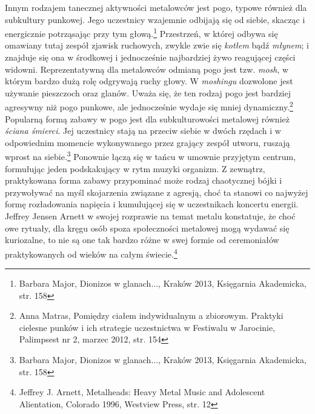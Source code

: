\documentclass[12pt, a4paper, titlepage]{report}
\begin{document}
Innym rodzajem tanecznej aktywności metalowców jest pogo, typowe również dla subkultury punkowej. Jego uczestnicy wzajemnie odbijają się od siebie, skacząc i energicznie potrząsając przy tym głową.\footnote{Barbara Major, Dionizos w glanach..., Kraków 2013, Księgarnia Akademicka, str. 158} Przestrzeń, w której odbywa się omawiany tutaj zespół zjawisk ruchowych, zwykle zwie się \textit{kotłem} bądź \textit{młynem}; i znajduje się ona w środkowej i jednocześnie najbardziej żywo reagującej części widowni. Reprezentatywną dla metalowców odmianą pogo jest tzw. \textit{mosh}, w którym bardzo dużą rolę odgrywają ruchy głowy. W \textit{moshingu} dozwolone jest używanie pieszczoch oraz glanów. Uważa się, że ten rodzaj pogo jest bardziej agresywny niż pogo punkowe, ale jednocześnie wydaje się mniej dynamiczny.\footnote{Anna Matras, Pomiędzy ciałem indywidualnym a zbiorowym. Praktyki cielesne punków i ich strategie uczestnictwa w Festiwalu w Jarocinie, Palimpsest nr 2, marzec 2012, str. 154} Popularną formą zabawy w pogo jest dla subkulturowości metalowej również \textit{ściana śmierci}. Jej uczestnicy stają na przeciw siebie w dwóch rzędach i w odpowiednim momencie wykonywanego przez grający zespół utworu, ruszają wprost na siebie.\footnote{Barbara Major, Dionizos w glanach..., Kraków 2013, Księgarnia Akademicka, str. 158} Ponownie łączą się w tańcu w umownie przyjętym centrum, formułując jeden podskakujący w rytm muzyki organizm. Z zewnątrz, praktykowana forma zabawy przypominać może rodzaj chaotycznej bójki i przywoływać na myśl skojarzenia związane z agresją, choć ta stanowi co najwyżej formę rozładowania napięcia i kumulującej się w uczestnikach koncertu energii. Jeffrey Jensen Arnett w swojej rozprawie na temat metalu konstatuje, że choć owe rytuały, dla kręgu osób spoza społeczności metalowej mogą wydawać się kuriozalne, to nie są one tak bardzo różne w swej formie od ceremoniałów praktykowanych od wieków na całym świecie.\footnote{Jeffrey J. Arnett, Metalheads: Heavy Metal Music and Adolescent Alientation, Colorado 1996, Westview Press, str. 12} 
\end{document}
